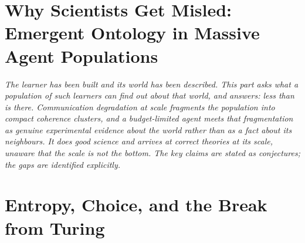 \documentclass[12pt,openright,twoside]{book}
\theoremstyle{remark}
\theoremstyle{plain}
\theoremstyle{remark}
\theoremstyle{plain}
\theoremstyle{plain}
\begin{document}
\part{Why Scientists Get Misled: Emergent Ontology in Massive Agent Populations}
\label{part:sciencebot}

\vspace{1em}
\begin{mdframed}[backgroundcolor=remarkgray, linecolor=gray!60,
                 linewidth=1pt, topline=false, rightline=false,
                 bottomline=false]
\small\itshape
The learner has been built and its world has been described.
This part asks what a \emph{population} of such learners can find out
about that world, and answers: less than is there.
Communication degradation at scale fragments the population into compact
coherence clusters, and a budget-limited agent meets that fragmentation
as genuine experimental evidence about the world rather than as a fact
about its neighbours.
It does good science and arrives at correct theories at its scale,
unaware that the scale is not the bottom.
The key claims are stated as conjectures; the gaps are identified
explicitly.
\end{mdframed}

\bigskip


\part{Entropy, Choice, and the Break from Turing}
\label{part:choice}
\end{document}
